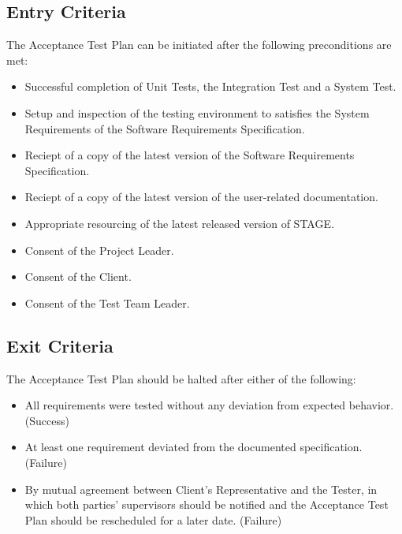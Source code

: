 \documentclass[titlepage]{article}
\begin{document}
\subsection{Entry Criteria}                                              
    The Acceptance Test Plan can be initiated after the following preconditions are met:
    \begin{itemize}
        \item Successful completion of Unit Tests, the Integration Test and a System Test.
        \item Setup and inspection of the testing environment to satisfies the System Requirements of the Software Requirements Specification.
        \item Reciept of a copy of the latest version of the Software Requirements Specification.
        \item Reciept of a copy of the latest version of the user-related documentation.
        \item Appropriate resourcing of the latest released version of STAGE.
        \item Consent of the Project Leader.
        \item Consent of the Client.
        \item Consent of the Test Team Leader.
    \end{itemize}


\subsection{Exit Criteria}
    The Acceptance Test Plan should be halted after either of the following:
    \begin{itemize}
        \item All requirements were tested without any deviation from expected behavior. (Success)
        \item At least one requirement deviated from the documented specification. (Failure)
        \item By mutual agreement between Client's Representative and the Tester, in which both parties' supervisors should be notified and the Acceptance Test Plan should be rescheduled for a later date. (Failure)
    \end{itemize}

\end{document}
